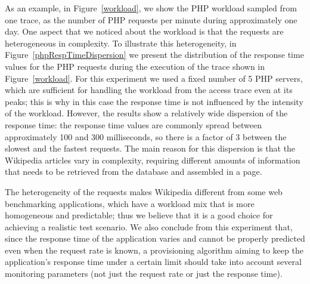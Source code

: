 As an example, in Figure~\ref{workload}, we show the PHP workload 
sampled from one trace, as the number of PHP requests per minute 
during approximately one day. One aspect that we noticed about the 
workload is that the requests are heterogeneous in complexity.
To illustrate this heterogeneity, in Figure~\ref{phpRespTimeDispersion}
we present the distribution of the response time values for the PHP 
requests during the execution of the trace shown in Figure~\ref{workload}.
For this experiment we used a fixed number of 5 PHP servers,
which are sufficient for handling the workload from the access 
trace even at its peaks; this is why in this case the response 
time is not influenced by the intensity of the workload.  
However, the results show a relatively wide 
dispersion of the response time: the response time values are 
commonly spread between approximately 100 and 300 milliseconds, 
so there is a factor of 3 between the slowest and the fastest requests. 
The main reason for this dispersion is that the Wikipedia articles 
vary in complexity, requiring different amounts of information that
needs to be retrieved from the database and assembled in a page. 

The heterogeneity of the requests makes Wikipedia different from 
some web benchmarking applications, which have a workload mix that
is more homogeneous and predictable; thus we believe that it is a good
choice for achieving a realistic test scenario. We also conclude from
this experiment that, since the response time of the application varies and 
cannot be properly predicted even when the request rate is known, 
a provisioning algorithm aiming to keep the application's response time 
under a certain limit should take into account several monitoring 
parameters (not just the request rate or just the response time).




